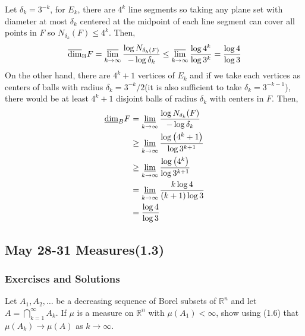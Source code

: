 \begin{customsol}{2.5}
    Let $\delta_k = 3^{-k}$, for $E_k$, there are $4^k$ line segments so taking any plane set with diameter at most $\delta_k$ centered at the midpoint of each line segment can cover all points in $F$ so $N_{\delta_k}(F)\leq 4^k$. Then,
    $$
    \overline{\operatorname{dim}}_\mathrm{B}F = \operatorname*{\overline{lim}}_{k\rightarrow\infty} \frac{\log N_{\delta_k(F)}}{-\log \delta_k}\leq \operatorname*{\overline{lim}}_{k\rightarrow\infty}\frac{\log 4^k}{\log 3^k} = \frac{\log 4}{\log 3}
    $$
    On the other hand, there are $4^k+1$ vertices of $E_k$ and if we take each vertices as centers of balls with radius $\delta_k = 3^{-k}/2$(it is also sufficient to take $\delta_k = 3^{-k-1}$), there would be at least $4^k+1$ disjoint balls of radius $\delta_k$ with centers in $F$. Then,
    $$
    \begin{aligned}
        \underline{\operatorname{dim}}_{B} F &=\operatorname*{\underline{lim}}_{k \rightarrow \infty} \frac{\log N_{\delta_{k}}(F)}{-\log \delta_{k}} \\
        & \geq \operatorname*{\underline{lim}}_{k \rightarrow \infty} \frac{\log \left(4^{k}+1\right)}{\log 3^{k+1}} \\
        & \geq \operatorname*{\underline{lim}}_{k \rightarrow \infty} \frac{\log \left(4^{k}\right)}{\log 3^{k+1}} \\
        & = \operatorname*{\underline{lim}}_{k \rightarrow \infty} \frac{k \log 4}{(k+1) \log 3}\\
        & =\frac{\log 4}{\log 3}
        \end{aligned}
    $$
\end{customsol}




\newpage

\subsection{May 28-31 Measures(1.3)}
\subsubsection{Exercises and Solutions}

\begin{customexercise}{1.18}
    Let $A_{1}, A_{2}, \ldots$ be a decreasing sequence of Borel subsets of $\mathbb{R}^{n}$ and let $A=\bigcap_{k=1}^{\infty} A_{k} .$ If $\mu$ is a measure on $\mathbb{R}^{n}$ with $\mu\left(A_{1}\right)<\infty$, show using (1.6) that $\mu\left(A_{k}\right) \rightarrow \mu(A)$ as $k \rightarrow \infty$.
\end{customexercise}

